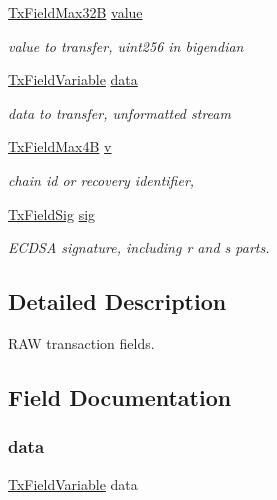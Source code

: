 \begin{DoxyCompactItemize}
\mbox{\hyperlink{boattypes_8h_af8a3635bb5261915dff042bd32f3466b}{Tx\+Field\+Max32B}} \mbox{\hyperlink{struct_t_rawtx_fields_a80bfe94443e25fd06909bad18d97cee5}{value}}
\begin{DoxyCompactList}\small\item\em value to transfer, uint256 in bigendian \end{DoxyCompactList}\item 
\mbox{\hyperlink{boattypes_8h_a3d1c482c13f3489376022445ceb3007e}{Tx\+Field\+Variable}} \mbox{\hyperlink{struct_t_rawtx_fields_a0357afaa18340675ab3f7914afc39a11}{data}}
\begin{DoxyCompactList}\small\item\em data to transfer, unformatted stream \end{DoxyCompactList}\item 
\mbox{\hyperlink{boattypes_8h_ab7fd9a1499bdebac4af3d80e7f7e64d5}{Tx\+Field\+Max4B}} \mbox{\hyperlink{struct_t_rawtx_fields_a163dd89c06c387b2ef1e0c58ff588539}{v}}
\begin{DoxyCompactList}\small\item\em chain id or recovery identifier, \end{DoxyCompactList}\item 
\mbox{\hyperlink{boattypes_8h_a23685ecc8096f312ef5572783b8cb8f0}{Tx\+Field\+Sig}} \mbox{\hyperlink{struct_t_rawtx_fields_a5fe389af52b068fe72f2f4554a6b8d42}{sig}}
\begin{DoxyCompactList}\small\item\em E\+C\+D\+SA signature, including r and s parts. \end{DoxyCompactList}\end{DoxyCompactItemize}


\subsection{Detailed Description}
R\+AW transaction fields. 

\subsection{Field Documentation}
\mbox{\label{struct_t_rawtx_fields_a0357afaa18340675ab3f7914afc39a11}} 
\subsubsection{\texorpdfstring{data}{data}}
{\footnotesize\ttfamily \mbox{\hyperlink{boattypes_8h_a3d1c482c13f3489376022445ceb3007e}{Tx\+Field\+Variable}} data}



